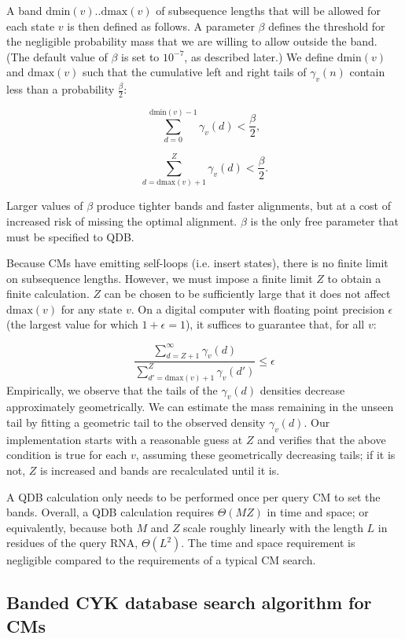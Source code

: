 \documentclass[11pt]{article}
\begin{document}
A band $\mbox{dmin}(v) .. \mbox{dmax}(v)$ of subsequence lengths that
will be allowed for each state $v$ is then defined as follows. A
parameter $\beta$ defines the threshold for the negligible probability
mass that we are willing to allow outside the band. (The default value
of $\beta$ is set to $10^{-7}$, as described later.) We define
$\mbox{dmin}(v)$ and $\mbox{dmax}(v)$ such that the cumulative left and
right tails of $\gamma_v(n)$ contain less than a probability
$\frac{\beta}{2}$:

\[
   \sum_{d = 0}^{\mbox{dmin}(v) - 1} \gamma_v(d) < \frac{\beta}{2},
\]

\[
   \sum_{d = \mbox{dmax}(v) + 1}^{Z} \gamma_v(d) < \frac{\beta}{2}.
\]

Larger values of $\beta$ produce tighter bands and faster alignments,
but at a cost of increased risk of missing the optimal
alignment. $\beta$ is the only free parameter that must be specified
to QDB.

Because CMs have emitting self-loops (i.e. insert states), there is no
finite limit on subsequence lengths. However, we must impose a finite
limit $Z$ to obtain a finite calculation.  $Z$ can be chosen to be
sufficiently large that it does not affect $\mbox{dmax}(v)$ for any
state $v$.  On a digital computer with floating point precision
$\epsilon$ (the largest value for which $1+\epsilon = 1$), it suffices
to guarantee that, for all $v$:

\[
  \frac{ \sum_{d = Z+1}^{\infty}  \gamma_v(d)}
       { \sum_{d' = \mbox{dmax}(v) + 1}^{Z} \gamma_v(d')}  \leq \epsilon
\]
Empirically, we observe that the tails of the $\gamma_v(d)$ densities
decrease approximately geometrically. We can estimate the mass
remaining in the unseen tail by fitting a geometric tail to the
observed density $\gamma_v(d)$. Our implementation starts with a
reasonable guess at $Z$ and verifies that the above condition is true
for each $v$, assuming these geometrically decreasing tails; if it is
not, $Z$ is increased and bands are recalculated until it is.

A QDB calculation only needs to be performed once per query CM to set the
bands. Overall, a QDB calculation requires $\Theta(MZ)$ in time and
space; or equivalently, because both $M$ and $Z$ scale roughly
linearly with the length $L$ in residues of the query RNA,
$\Theta(L^2)$. The time and space requirement is negligible compared
to the requirements of a typical CM search.

\subsection{Banded CYK database search algorithm for CMs}
\end{document}

